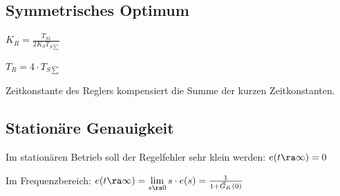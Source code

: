\documentclass[german]{latex4ei_fs}
\begin{document}
\begin{sectionbox}
\subsection{Symmetrisches Optimum}
$K_R = \frac{T_{S1}}{2 K_S T_{S \sum}}$

$T_R = 4 \cdot T_{S \sum}$

Zeitkonstante des Reglers kompensiert die Summe der kurzen Zeitkonstanten.

\end{sectionbox}
\begin{sectionbox}

\subsection{Stationäre Genauigkeit} 

Im stationären Betrieb soll der Regelfehler sehr klein werden:
$e (t \ra \infty) = 0$

Im Frequenzbereich:
$e (t \ra \infty) = \lim \limits_{s \ra 0} s \cdot e(s) = \frac{1}{1 + \vec G_K (0)}$
\end{sectionbox}
\end{document}

